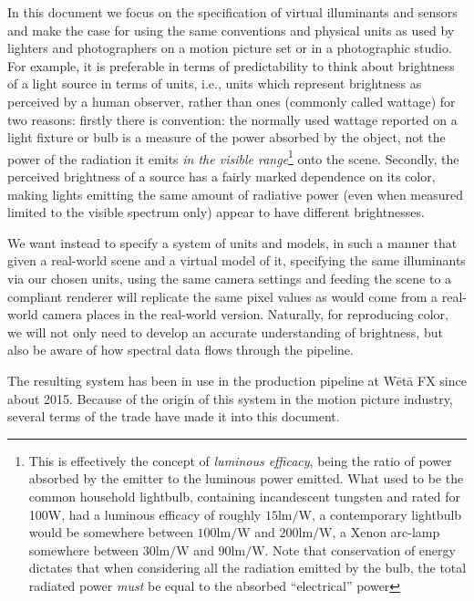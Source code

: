 In this document we focus on the specification of \gls{virtual} \glspl{illuminant} and
\glspl{sensor} and make the case for using the same conventions and physical units as
used by lighters and photographers on a motion picture set or in a photographic studio. 
For example, it is preferable in terms of predictability to think about brightness of a 
light source in terms of  units, i.e., units which represent brightness as
perceived by a \gls{human observer}, rather than  ones 
(commonly called \gls{wattage}) for two reasons: 
firstly there is convention: the normally used wattage reported on a light fixture or bulb 
is a measure of the power absorbed by the object, not the power of the radiation it emits 
\emph{in the visible range}\footnote{This is effectively the concept of  
	\textsl{\gls{luminous efficacy}}, being the ratio of power absorbed by the emitter
	to the luminous power emitted. 
	What used to be the common household lightbulb, containing incandescent tungsten and 
	rated for 100W, had a luminous efficacy of roughly $15\unit{\lumen\per\watt}$, 
	a contemporary  lightbulb would be somewhere between 
	$100\unit{\lumen\per\watt}$ and $200\unit{\lumen\per\watt}$, 
	a Xenon arc-lamp somewhere between $30\unit{\lumen\per\watt}$ and
	$90\unit{\lumen\per\watt}$. 
	Note that conservation of energy dictates that when considering all the
	radiation emitted by the bulb, the total radiated power \emph{must} be equal 
	to the absorbed ``electrical'' power} onto the \gls{scene}. 
Secondly, the perceived \gls{brightness} of a source has a fairly marked dependence on 
its color, making lights emitting the same amount of radiative power (even when measured 
limited to the visible spectrum only) appear to have different brightnesses. 

We want instead to specify a system of units and models, in such a manner that
given a real-world scene and a virtual model of it,
specifying the same illuminants via our chosen units, using the same
camera settings and feeding the scene to a compliant renderer will replicate 
the same pixel values as would come from a real-world camera places in the 
real-world version. 
Naturally, for reproducing color, we will not only need
to develop an accurate understanding of brightness, but also be aware
of how \gls{spectral} data flows through the \gls{pipeline}.



The resulting system has been in use in the
production pipeline at W\=et\=a FX since about 2015.
Because of the origin of this system in the motion picture industry,
several terms of the trade have made it into this document. 


